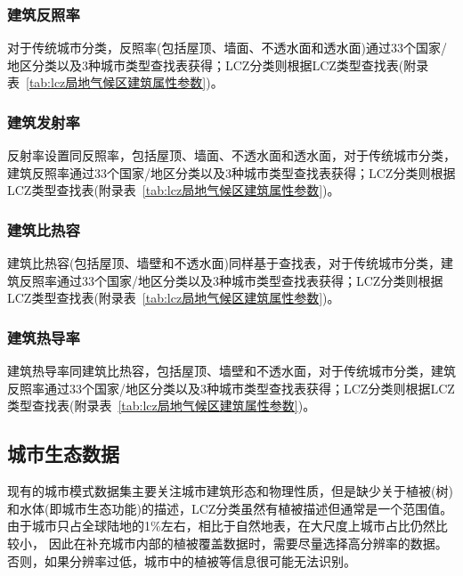 \subsubsection{建筑反照率}\label{建筑反照率}
对于传统城市分类，反照率(包括屋顶、墙面、不透水面和透水面)通过33个国家/地区分类以及3种城市类型查找表获得；LCZ分类则根据LCZ类型查找表(附录表~\ref{tab:lcz局地气候区建筑属性参数})。

\subsubsection{建筑发射率}\label{建筑发射率}
反射率设置同反照率，包括屋顶、墙面、不透水面和透水面，对于传统城市分类，建筑反照率通过33个国家/地区分类以及3种城市类型查找表获得；LCZ分类则根据LCZ类型查找表(附录表~\ref{tab:lcz局地气候区建筑属性参数})。

\subsubsection{建筑比热容}\label{建筑比热容}
建筑比热容(包括屋顶、墙壁和不透水面)同样基于查找表，对于传统城市分类，建筑反照率通过33个国家/地区分类以及3种城市类型查找表获得；LCZ分类则根据LCZ类型查找表(附录表~\ref{tab:lcz局地气候区建筑属性参数})。

\subsubsection{建筑热导率}\label{建筑热导率}
建筑热导率同建筑比热容，包括屋顶、墙壁和不透水面，对于传统城市分类，建筑反照率通过33个国家/地区分类以及3种城市类型查找表获得；LCZ分类则根据LCZ类型查找表(附录表~\ref{tab:lcz局地气候区建筑属性参数})。

\subsection{城市生态数据}\label{城市生态数据}
现有的城市模式数据集主要关注城市建筑形态和物理性质，但是缺少关于植被(树)和水体(即城市生态功能)的描述，LCZ分类虽然有植被描述但通常是一个范围值。由于城市只占全球陆地的1\%左右，相比于自然地表，在大尺度上城市占比仍然比较小，
因此在补充城市内部的植被覆盖数据时，需要尽量选择高分辨率的数据。否则，如果分辨率过低，城市中的植被等信息很可能无法识别。

